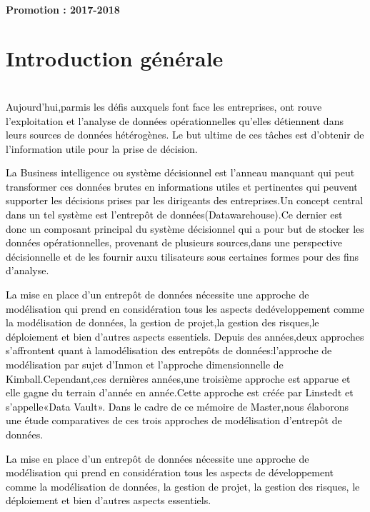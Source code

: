 \documentclass[a4paper,12pt]{report}
\begin{document}
		~~\\
		\vskip 0.3in
		\begin{center}
			\vspace{0.3cm} \textbf{Promotion : 2017-2018}
		\end{center}
	\newpage
		

\newpage
\tableofcontents
	
		
		
		\chapter{Introduction générale}
\\
    



\textcolor{black}{Aujourd’hui,parmis les défis auxquels font face les entreprises, ont rouve l’exploitation et l’analyse de données opérationnelles qu’elles détiennent dans leurs sources de données hétérogènes. Le but ultime de ces tâches est d’obtenir de l’information utile pour la prise de décision.
}

 \textcolor{black}{La Business intelligence ou système décisionnel est l’anneau manquant qui peut transformer ces données brutes en informations utiles et pertinentes qui peuvent supporter les décisions prises par les dirigeants des entreprises.Un concept central dans un tel système est l’entrepôt de données(Datawarehouse).Ce dernier est donc un composant principal du système décisionnel qui a pour but de stocker les données opérationnelles, provenant de plusieurs sources,dans une perspective décisionnelle et de les fournir auxu tilisateurs sous certaines formes pour des fins d’analyse.
 }


\textcolor{black}{La mise en place d’un entrepôt de données nécessite une approche de modélisation qui prend en considération tous les aspects dedéveloppement comme la modélisation de données, la gestion de projet,la gestion des risques,le déploiement et bien d’autres aspects essentiels.
Depuis des années,deux approches s’affrontent quant à lamodélisation des entrepôts de données:l’approche de modélisation par sujet d’Inmon et l’approche dimensionnelle de Kimball.Cependant,ces dernières années,une troisième approche est apparue et elle gagne du terrain d’année en année.Cette approche est créée par Linstedt et s’appelle«Data Vault».
Dans le cadre de ce mémoire de Master,nous élaborons une étude comparatives de ces trois approches de modélisation d’entrepôt de données.}


\textcolor{black}{La mise en place d’un entrepôt de données nécessite une approche de modélisation qui
prend en considération tous les aspects de développement comme la modélisation de données, la
gestion de projet, la gestion des risques, le déploiement et bien d’autres aspects essentiels.}
\end{document}
